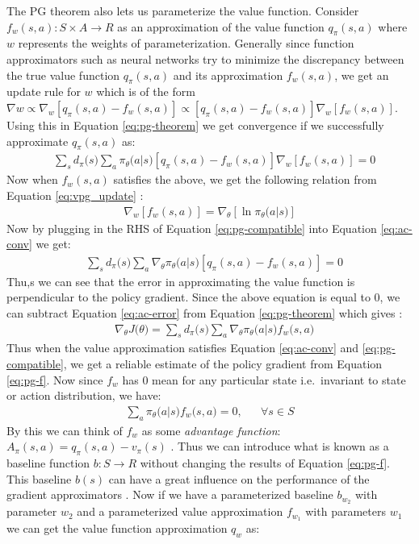 \documentclass[12pt]{extarticle}
\numberwithin{equation}{section}
\begin{document}
	The PG theorem also lets us parameterize the value function. Consider $f_w(s,a) \colon S \times A \rightarrow R$ as an approximation of the value function $q_{\pi}(s,a)$ where $w$ represents the weights of parameterization. Generally since function approximators such as neural networks try to minimize the discrepancy between the true value function $q_{\pi}(s,a)$ and its approximation $f_w(s,a)$, we get an update rule for $w$ which is of the form $\nabla w \propto \nabla_w[q_{\pi}(s,a) - f_w(s,a)]\propto [q_{\pi}(s,a) - f_w(s,a)]\nabla_w[f_w(s,a)]$. Using this in Equation \ref{eq:pg-theorem} we get convergence if we successfully approximate $q_{\pi}(s,a)$  as:
	\begin{align} &\sum_{s}d_{\pi}\big(s\big)\sum_{a} \pi_{\theta}\big(a|s\big) [q_{\pi}(s,a) - f_w(s,a)]\nabla_w[f_w(s,a)] = 0 \label{eq:ac-conv}
	\end{align}
	Now when $f_w(s,a)$ satisfies the above, we get the following relation from Equation \ref{eq:vpg_update} :
	\begin{align}
	\nabla_w[f_w(s,a)] = \nabla_{\theta}[\ln\pi_{\theta}\big(a|s\big)] \label{eq:pg-compatible}
	\end{align}
	Now by plugging in the RHS of Equation \ref{eq:pg-compatible} into Equation \ref{eq:ac-conv} we get:
	\begin{align} &\sum_{s}d_{\pi}\big(s\big)\sum_{a} \nabla_{\theta}\pi_{\theta}\big(a|s\big) [q_{\pi}(s,a) - f_w(s,a)] = 0 \label{eq:ac-error}
	\end{align}
	Thu,s we can see that the error in approximating the value function is perpendicular to the policy gradient. Since the above equation is equal to 0, we can subtract Equation \ref{eq:ac-error} from Equation \ref{eq:pg-theorem} which gives :
	\begin{align}
	&\nabla_{\theta}J\big(\theta\big) =  \sum_{s}d_{\pi}\big(s\big)\sum_{a}\nabla_{\theta} \pi_{\theta}\big(a|s\big)f_w\big(s,a\big) \label{eq:pg-f}
	\end{align}
	Thus when the value approximation satisfies Equation \ref{eq:ac-conv} and \ref{eq:pg-compatible}, we get a reliable estimate of the policy gradient from Equation \ref{eq:pg-f}. Now since $f_w$ has 0 mean for any particular state i.e.\ invariant to state or action distribution, we have:
	\begin{align}
	\sum_{a} \pi_{\theta}\big(a|s\big)f_w\big(s,a\big) = 0, &&\forall s\in S
	\end{align}
	By this we can think of $f_w$ as some \textit{advantage function}: $A_{\pi}(s,a) = q_{\pi}(s,a) - v_{\pi}(s)$ \cite{peters2005natural}\cite{Sutton_pg}. Thus we can introduce what is known as a baseline function $b\colon S \rightarrow R$\cite{peters2005natural} without changing the results of Equation \ref{eq:pg-f}. This baseline $b(s)$ can have a great influence on the performance of the gradient approximators \cite{Sutton_pg}. Now if we have a parameterized baseline $b_{w_2}$ with parameter $w_2$ and a parameterized value approximation $f_{w_1}$ with parameters $w_1$ we can get the value function approximation $q_w$ as:
\end{document}

